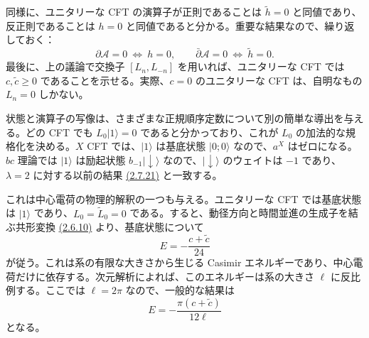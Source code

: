 同様に、ユニタリーな CFT の演算子が正則であることは $\widetilde h=0$ と同値であり、反正則であることは $h=0$ と同値であると分かる。重要な結果なので、繰り返しておく：
\begin{equation}
\partial\mathcal A=0\ \Longleftrightarrow\ h=0,\qquad
\bar\partial\mathcal A=0\ \Longleftrightarrow\ \widetilde h=0.
\tag{2.9.16}\label{eq:2.9.16}
\end{equation}
最後に、上の議論で交換子 $[L_n,L_{-n}]$ を用いれば、ユニタリーな CFT では $c,\widetilde c\geq0$ であることを示せる。実際、$c=0$ のユニタリーな CFT は、自明なもの $L_n=0$ しかない。


状態と演算子の写像は、さまざまな正規順序定数について別の簡単な導出を与える。どの CFT でも $L_0\lvert1\rangle=0$ であると分かっており、これが $L_0$ の加法的な規格化を決める。$X$ CFT では、$\lvert1\rangle$ は基底状態 $\lvert0;0\rangle$ なので、$a^X$ はゼロになる。$bc$ 理論では $\lvert1\rangle$ は励起状態 $b_{-1}\lvert\downarrow\rangle$ なので、$\lvert\downarrow\rangle$ のウェイトは $-1$ であり、$\lambda=2$ に対する以前の結果 \hyperref[eq:2.7.21]{(2.7.21)} と一致する。

これは中心電荷の物理的解釈の一つも与える。ユニタリーな CFT では基底状態は $\lvert1\rangle$ であり、$L_0=\widetilde L_0=0$ である。すると、動径方向と時間並進の生成子を結ぶ共形変換 \hyperref[eq:2.6.10]{(2.6.10)} より、基底状態について
\begin{equation}
E=-\frac{c+\widetilde c}{24}
\tag{2.9.17}\label{eq:2.9.17}
\end{equation}
が従う。これは系の有限な大きさから生じる Casimir エネルギーであり、中心電荷だけに依存する。次元解析によれば、このエネルギーは系の大きさ $\ell$ に反比例する。ここでは $\ell=2\pi$ なので、一般的な結果は
\begin{equation}
E=-\frac{\pi(c+\widetilde c)}{12\ell}
\tag{2.9.18}\label{eq:2.9.18}
\end{equation}
となる。

